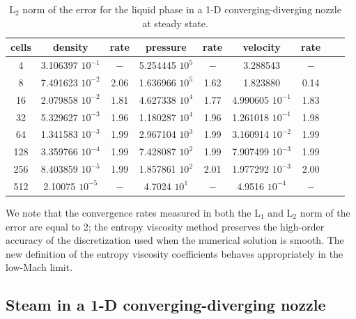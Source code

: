 \documentclass[preprint,10pt]{elsarticle}
\newcommand{\tcr}[1]{\textcolor{red}{#1}}
\newcommand{\tcb}[1]{\textcolor{blue}{#1}}
\begin{document}
%
%
\begin{table}[H]
\begin{center}
 \caption{\label{tbl:l2_norm_liq} L$_2$ norm of the error for the liquid phase in a 1-D converging-diverging nozzle at steady state.}
 \begin{tabular}{|c|c|c|c|c|c|c|c|c|}
 \hline
cells& density            & rate & pressure          & rate & velocity           & rate \\ \hline
4    & 3.106397 $10^{-1}$ & $-$  & 5.254445 $10^{5}$ & $-$  & 3.288543           & $-$  \\ \hline
8    & 7.491623 $10^{-2}$ & 2.06 & 1.636966 $10^{5}$ & 1.62 & 1.823880           & 0.14 \\ \hline
16   & 2.079858 $10^{-2}$ & 1.81 & 4.627338 $10^{4}$ & 1.77 & 4.990605 $10^{-1}$ & 1.83 \\ \hline
32   & 5.329627 $10^{-3}$ & 1.96 & 1.180287 $10^{4}$ & 1.96 & 1.261018 $10^{-1}$ & 1.98 \\ \hline
64   & 1.341583 $10^{-3}$ & 1.99 & 2.967104 $10^{3}$ & 1.99 & 3.160914 $10^{-2}$ & 1.99 \\ \hline
128  & 3.359766 $10^{-4}$ & 1.99 & 7.428087 $10^{2}$ & 1.99 & 7.907499 $10^{-3}$ & 1.99 \\ \hline
256  & 8.403859 $10^{-5}$ & 1.99 & 1.857861 $10^{2}$ & 2.01 & 1.977292 $10^{-3}$ & 2.00 \\ \hline
512  & 2.10075  $10^{-5}$ & $-$ & 4.7024   $10^{1}$ & $-$ & 4.9516   $10^{-4}$ & $-$ \\ \hline
\end{tabular}
\end{center}
\end{table}
We note that the convergence rates measured in both the L$_1$ and L$_2$ norm of the error are equal to 2; the entropy viscosity method preserves 
the high-order accuracy of the discretization used when the numerical solution is smooth. The new definition of the entropy viscosity coefficients behaves 
appropriately in the low-Mach limit.

\subsection{Steam in a 1-D converging-diverging nozzle} \label{sec:steam_nozzle}
\end{document}
